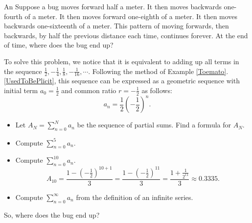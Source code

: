 \begin{exercise}{An  \Coffeecup \Coffeecup \Coffeecup}\label{alternatebug}
Suppose a bug moves forward half a meter.  It then moves backwards one-fourth of a meter. It then moves forward one-eighth of a meter.  It then moves backwards one-sixteenth of a meter.  This pattern of moving forwards, then backwards, by half the previous distance each time, continues forever.  At the end of time, where does the bug end up?

To solve this problem, we notice that it is equivalent to adding up all terms in the sequence $\frac{1}{2},-\frac{1}{4},\frac{1}{8},-\frac{1}{16},\cdots $.  Following the method of Example \ref{Toemato}.\ref{UsedToBePlicit},
this sequence can be expressed as a geometric sequence with initial term $a_0=\frac{1}{2}$ and common ratio $r=-\frac{1}{2}$ as follows: $$ a_n=\frac{1}{2}\left( -\frac{1}{2} \right) ^n.$$
\begin{itemize}
\item Let $A_N=\sum_{n=0}^N a_n$ be the sequence of partial sums.  Find a formula for $A_N$. 
\item  Compute $ \sum_{n=0}^{5} a_n.$
\item  Compute $ \sum_{n=0}^{10} a_n.$
    $$A_{10}=\frac{1-\left(-\frac{1}{2}\right)^{10+1}}{3}=\frac{1-\left(-\frac{1}{2}\right)^{11}}{3}=\frac{1+\frac{1}{2^{11}}}{3}\approx 0.3335.$$
\item Compute $ \sum_{n=0}^{\infty} a_n$ from the definition of an infinite series.
\end{itemize}

So, where does the bug end up?
\end{exercise}
